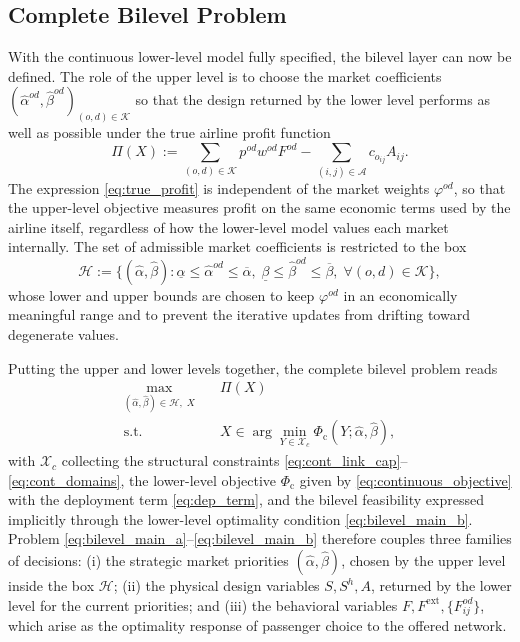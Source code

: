 \subsection{Complete Bilevel Problem}
\label{sec:bilevel_complete}
With the continuous lower-level model fully specified, the bilevel layer can now be defined. The role of the upper level is to choose the market coefficients $(\widehat{\alpha}^{od},\widehat{\beta}^{od})_{(o,d)\in\mathcal{K}}$ so that the design returned by the lower level performs as well as possible under the true airline profit function
\begin{equation}
\Pi(X):=
\sum_{(o,d)\in\mathcal{K}} p^{od}w^{od}F^{od}
-\sum_{(i,j)\in\mathcal{A}} c_{o_{ij}}A_{ij}.
\label{eq:true_profit}
\end{equation}
The expression \eqref{eq:true_profit} is independent of the market weights $\varphi^{od}$, so that the upper-level objective measures profit on the same economic terms used by the airline itself, regardless of how the lower-level model values each market internally. The set of admissible market coefficients is restricted to the box
\begin{equation}
\mathcal{H}:=
\bigl\{(\widehat{\alpha},\widehat{\beta}):
\underline{\alpha}\le \widehat{\alpha}^{od}\le \overline{\alpha},\;
\underline{\beta}\le \widehat{\beta}^{od}\le \overline{\beta},\;
\forall (o,d)\in\mathcal{K}\bigr\},
\label{eq:hyperparameter_box}
\end{equation}
whose lower and upper bounds are chosen to keep $\varphi^{od}$ in an economically meaningful range and to prevent the iterative updates from drifting toward degenerate values.

Putting the upper and lower levels together, the complete bilevel problem reads
\begin{align}
\max_{(\widehat{\alpha},\widehat{\beta})\in\mathcal{H},\;X}
\quad & \Pi(X) \label{eq:bilevel_main_a}\\
\text{s.t.}\quad &
X\in\arg\min_{Y\in\mathcal{X}_c}\Phi_{\mathrm{c}}(Y;\widehat{\alpha},\widehat{\beta}),
\label{eq:bilevel_main_b}
\end{align}
with $\mathcal{X}_c$ collecting the structural constraints \eqref{eq:cont_link_cap}--\eqref{eq:cont_domains}, the lower-level objective $\Phi_{\mathrm{c}}$ given by \eqref{eq:continuous_objective} with the deployment term \eqref{eq:dep_term}, and the bilevel feasibility expressed implicitly through the lower-level optimality condition \eqref{eq:bilevel_main_b}. Problem \eqref{eq:bilevel_main_a}--\eqref{eq:bilevel_main_b} therefore couples three families of decisions: (i) the strategic market priorities $(\widehat{\alpha},\widehat{\beta})$, chosen by the upper level inside the box $\mathcal{H}$; (ii) the physical design variables $S,S^h,A$, returned by the lower level for the current priorities; and (iii) the behavioral variables $F,F^{\mathrm{ext}},\{F_{ij}^{od}\}$, which arise as the optimality response of passenger choice to the offered network.

